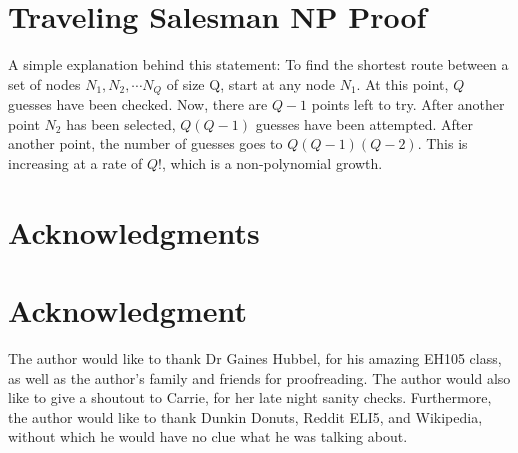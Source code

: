 \documentclass[10pt,journal,compsoc]{IEEEtran}
\begin{document}
\section{Traveling Salesman NP Proof}
A simple explanation behind this statement: To find the shortest route between a set of nodes $N_1,N_2,\cdots N_Q$ of size Q, start at any node $N_1$. At this point, $Q$ guesses have been checked. Now, there are $Q-1$ points left to try. After another point $N_2$ has been selected, $Q(Q-1)$ guesses have been attempted. After another point, the number of guesses goes to $Q(Q-1)(Q-2)$. This is increasing at a rate of $Q!$, which is a non-polynomial growth. 

\ifCLASSOPTIONcompsoc
  \section*{Acknowledgments}
\else
  \section*{Acknowledgment}
\fi


The author would like to thank Dr Gaines Hubbel, for his amazing EH105 class, as well as the author's family and friends for proofreading. The author would also like to give a shoutout to Carrie, for her late night sanity checks. Furthermore, the author would like to thank Dunkin Donuts, Reddit ELI5, and Wikipedia, without which he would have no clue what he was talking about.


\ifCLASSOPTIONcaptionsoff
  \newpage
\fi





%
%
%
\end{document}
